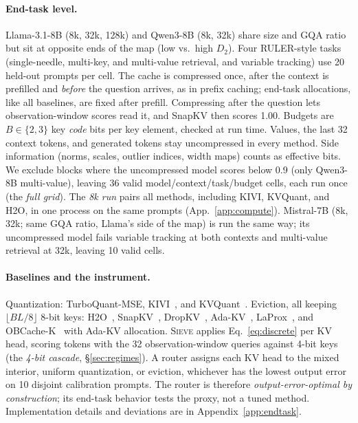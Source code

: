 \documentclass{article}
\newcommand{\sieve}{\textsc{Sieve}}
\theoremstyle{definition}
\begin{document}
\paragraph{End-task level.}
Llama-3.1-8B (8k, 32k, 128k) and Qwen3-8B (8k, 32k) share size and GQA ratio but sit at opposite ends of the map (low vs.\ high $D_2$).  Four RULER-style tasks~\citep{hsieh2024ruler} (single-needle, multi-key, and multi-value retrieval, and variable tracking) use 20 held-out prompts per cell.  The cache is compressed once, after the context is prefilled and \emph{before} the question arrives, as in prefix caching; end-task allocations, like all baselines, are fixed after prefill.  Compressing after the question lets observation-window scores read it, and SnapKV then scores 1.00.  Budgets are $B\in\{2,3\}$ key \emph{code} bits per key element, checked at run time.  Values, the last 32 context tokens, and generated tokens stay uncompressed in every method.  Side information (norms, scales, outlier indices, width maps) counts as effective bits.  We exclude blocks where the uncompressed model scores below 0.9 (only Qwen3-8B multi-value), leaving 36 valid model/context/task/budget cells, each run once (the \emph{full grid}).  The \emph{8k run} pairs all methods, including KIVI, KVQuant, and H2O, in one process on the same prompts (App.~\ref{app:compute}).  Mistral-7B (8k, 32k; same GQA ratio, Llama's side of the map) is run the same way; its uncompressed model fails variable tracking at both contexts and multi-value retrieval at 32k, leaving 10 valid cells.

\paragraph{Baselines and the instrument.}
Quantization: TurboQuant-MSE, KIVI~\citep{liu2024kivi}, and KVQuant~\citep{hooper2024kvquant}.  Eviction, all keeping $\lfloor BL/8\rfloor$ 8-bit keys: H2O~\citep{zhang2023h2o}, SnapKV~\citep{li2024snapkv}, DropKV~\citep{zhang2026dropkv}, Ada-KV~\citep{feng2024adakv}, LaProx~\citep{mai2026laprox}, and OBCache-K~\citep{gu2026obcache} with Ada-KV allocation.  \sieve{} applies Eq.~\ref{eq:discrete} per KV head, scoring tokens with the 32 observation-window queries against 4-bit keys (the \emph{4-bit cascade}, \S\ref{sec:regimes}).  A router assigns each KV head to the mixed interior, uniform quantization, or eviction, whichever has the lowest output error on 10 disjoint calibration prompts.  The router is therefore \emph{output-error-optimal by construction}; its end-task behavior tests the proxy, not a tuned method.  Implementation details and deviations are in Appendix~\ref{app:endtask}.
\end{document}
